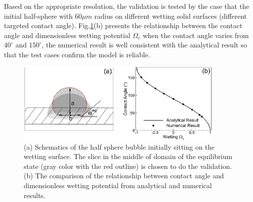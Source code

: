 \documentclass[10pt]{elsarticle}
\begin{document}
Based on the appropriate resolution, the validation is tested by the case that the initial half-sphere with $60\mu m$ radius on different wetting solid surfaces (different targeted contact angle). Fig.\ref{fig:validation}(b) presents the relationship between the contact angle and dimensionless wetting potential $\Omega_c$ when the contact angle varies from $40^\circ$ and $150^\circ$, the numerical result is well consistent with the analytical result so that the test cases confirm the model is reliable.
\begin{figure}[!htpb]
  \centering
  \includegraphics[width=0.9\textwidth]{Validations.eps}
  \caption{(a) Schematics of the half sphere bubble initially sitting on the wetting surface. The slice in the middle of domain of the equilibrium state (gray color with the red outline) is chosen to do the validation. (b) The comparison of the relationship between contact angle and dimensionless wetting potential from analytical and numerical results.  }\label{fig:validation}
\end{figure}
\end{document}
